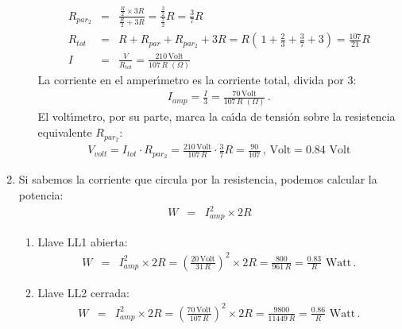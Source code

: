 \documentclass[a4paper,12pt]{article}
\begin{document}
\begin{enumerate}
\begin{enumerate}
\begin{eqnarray}
R_{par_{2}} &=& \frac{ \frac{R}{2} \times 3R}{\frac{R}{2}+3R} = 
\frac{ \frac{3}{2} }{\frac{7}{2} }R = \frac{3}{7} R \nonumber \\
R_{tot} &=& R  + R_{par} + R_{par_{2}} + 3R = 
R \left(\, 1 + \frac{2}{3} + \frac{3}{7} + 3 \right) = 
\frac{107}{21} R \nonumber \\
I &=& \frac{V}{R_{tot}} = \frac{210 \, \mathrm{Volt}}{107 \, R \,\, (\Omega)}  
\nonumber 
\end{eqnarray}
La corriente en el amper\'{\i}metro es la corriente total, divida por 
3:
\begin{eqnarray}
I_{amp} = \frac{I}{3} = \frac{70 \, \mathrm{Volt}}{107 \, R \,\, (\Omega)}  
\nonumber  \, .
\end{eqnarray}
El volt\'{\i}metro, por su parte, marca la ca\'{\i}da de tensi\'on 
sobre la resistencia equivalente $R_{par_{2}}$:
\begin{eqnarray}
V_{volt} = I_{tot} \cdot R_{par_{2}} = 
\frac{210 \, \mathrm{Volt}}{107 \, R }  \cdot \frac{3}{7} R = 
\frac{90}{107} \,,\, \mathrm{Volt} = 0.84 \,\, \mathrm{Volt} 
\nonumber 
\end{eqnarray}


\end{enumerate}


\vspace{1cm}
\item 
Si sabemos la corriente que circula por la resistencia, podemos 
calcular la potencia:
\begin{eqnarray}
W &=& I^2_{amp} \times 2 R 
\nonumber
\end{eqnarray}
\begin{enumerate}
\item Llave LL1 abierta:
\begin{eqnarray}
W &=& I^2_{amp} \times 2 R = 
\left( \frac{20 \, \mathrm{Volt}}{31 \, R } \right)^2 \times 2 R =  
\frac{800}{961 \, R} = \frac{0.83}{R} \,\, \mathrm{Watt} \nonumber  \, .
\end{eqnarray}

\item Llave LL2 cerrada: 
\begin{eqnarray}
W &=& I^2_{amp} \times 2 R = 
\left(  \frac{70 \, \mathrm{Volt}}{107 \, R}  \right)^2 \times 2 R =  
\frac{9800}{11449 \, R} = \frac{0.86}{R} \,\, \mathrm{Watt} \nonumber  \, .
\end{eqnarray}


\end{enumerate}
\end{enumerate}
\end{document}
